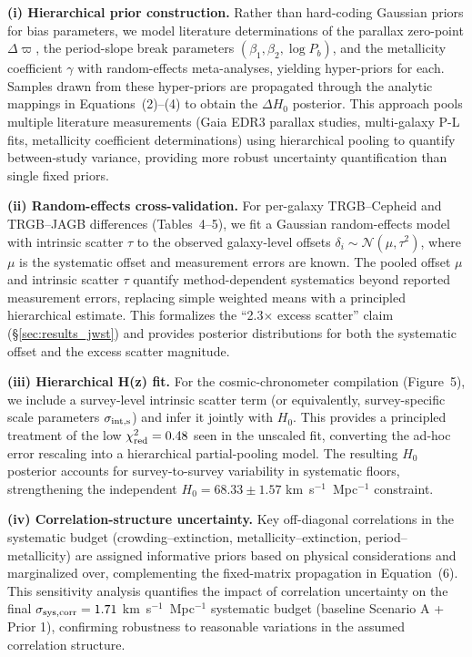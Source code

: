 \documentclass[preprint, linenumbers]{aastex701}
\begin{document}
\textbf{(i) Hierarchical prior construction.} Rather than hard-coding Gaussian priors for bias parameters, we model literature determinations of the parallax zero-point $\Delta\varpi$, the period-slope break parameters $(\beta_1, \beta_2, \log P_b)$, and the metallicity coefficient $\gamma$ with random-effects meta-analyses, yielding hyper-priors for each. Samples drawn from these hyper-priors are propagated through the analytic mappings in Equations~(2)--(4) to obtain the $\Delta H_0$ posterior. This approach pools multiple literature measurements (Gaia EDR3 parallax studies, multi-galaxy P-L fits, metallicity coefficient determinations) using hierarchical pooling to quantify between-study variance, providing more robust uncertainty quantification than single fixed priors.

\textbf{(ii) Random-effects cross-validation.} For per-galaxy TRGB--Cepheid and TRGB--JAGB differences (Tables~4--5), we fit a Gaussian random-effects model with intrinsic scatter $\tau$ to the observed galaxy-level offsets $\delta_i \sim \mathcal{N}(\mu, \tau^2)$, where $\mu$ is the systematic offset and measurement errors are known. The pooled offset $\mu$ and intrinsic scatter $\tau$ quantify method-dependent systematics beyond reported measurement errors, replacing simple weighted means with a principled hierarchical estimate. This formalizes the ``2.3$\times$ excess scatter'' claim (\S\ref{sec:results_jwst}) and provides posterior distributions for both the systematic offset and the excess scatter magnitude.

\textbf{(iii) Hierarchical H(z) fit.} For the cosmic-chronometer compilation (Figure~5), we include a survey-level intrinsic scatter term (or equivalently, survey-specific scale parameters $\sigma_{\rm int,s}$) and infer it jointly with $H_0$. This provides a principled treatment of the low $\chi^2_{\rm red} = 0.48$ seen in the unscaled fit, converting the ad-hoc error rescaling into a hierarchical partial-pooling model. The resulting $H_0$ posterior accounts for survey-to-survey variability in systematic floors, strengthening the independent $H_0 = 68.33 \pm 1.57$ km~s$^{-1}$~Mpc$^{-1}$ constraint.

\textbf{(iv) Correlation-structure uncertainty.} Key off-diagonal correlations in the systematic budget (crowding--extinction, metallicity--extinction, period--metallicity) are assigned informative priors based on physical considerations and marginalized over, complementing the fixed-matrix propagation in Equation~(6). This sensitivity analysis quantifies the impact of correlation uncertainty on the final $\sigma_{\rm sys,corr} = 1.71$ km~s$^{-1}$~Mpc$^{-1}$ systematic budget (baseline Scenario A + Prior 1), confirming robustness to reasonable variations in the assumed correlation structure.
\end{document}
